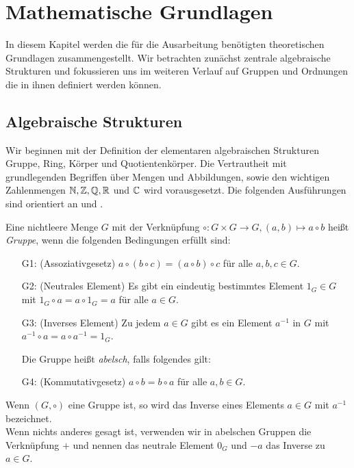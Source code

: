 \chapter{Mathematische Grundlagen}
In diesem Kapitel werden die für die Ausarbeitung benötigten theoretischen Grundlagen zusammengestellt. Wir betrachten zunächst zentrale algebraische Strukturen und fokussieren uns im weiteren Verlauf auf Gruppen und Ordnungen die in ihnen definiert werden können.
\section{Algebraische Strukturen}
Wir beginnen mit der Definition der elementaren algebraischen Strukturen Gruppe, Ring, Körper und Quotientenkörper. Die Vertrautheit mit grundlegenden Begriffen über Mengen und Abbildungen, sowie den wichtigen Zahlenmengen $\mathbb{N}, \mathbb{Z}, \mathbb{Q}, \mathbb{R}$ und $\mathbb{C}$ wird vorausgesetzt. Die folgenden Ausführungen sind orientiert an \cite{rainer08} und \cite{fischer08}.
%
\begin{defn}\label{Gruppe}
Eine nichtleere Menge $G$ mit der Verknüpfung $\circ \colon G \times G \rightarrow G, \left( a, b\right) \mapsto a \circ b$ heißt \textit{Gruppe}, wenn die folgenden Bedingungen erfüllt sind:
\begin{enumerate}
\item[G1: ] (Assoziativgesetz) $a\circ \left(b\circ c\right) = \left(a\circ b\right) \circ c$ für alle $a, b, c \in G$.
\item[G2: ] (Neutrales Element) Es gibt ein eindeutig bestimmtes Element $1_G \in G$ mit $1_G \circ a  = a \circ 1_G = a$ für alle $a \in G$.
\item[G3: ] (Inverses Element) Zu jedem $a \in G$ gibt es ein Element $a^{-1}$ in $G$ mit $a^{-1} \circ a = a \circ a^{-1} = 1_G$. \\
\item[] Die Gruppe heißt \textit{abelsch}, falls folgendes gilt: 
\item[G4: ] (Kommutativgesetz) $a \circ b = b \circ a$ für alle $a, b \in G$.  
\end{enumerate} 
\end{defn}
%
%
\begin{bem}
Wenn $\left(G, \circ\right)$ eine Gruppe ist, so wird das Inverse eines Elements $a\in G$ mit $a^{-1}$ bezeichnet. \\
Wenn nichts anderes gesagt ist, verwenden wir in abelschen Gruppen die Verknüpfung $+$ und nennen das neutrale Element $0_G$ und $-a$ das Inverse zu $a\in G$. 
\end{bem}
